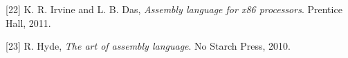 \documentclass[12pt,twoside]{templates/unerthesis}
\begin{document}
\leavevmode\hypertarget{ref-irvine2011assembly}{}%
{[}22{]} K. R. Irvine and L. B. Das, \emph{Assembly language for x86 processors}. Prentice Hall, 2011.

\leavevmode\hypertarget{ref-hyde2010art}{}%
{[}23{]} R. Hyde, \emph{The art of assembly language}. No Starch Press, 2010.




\end{document}
